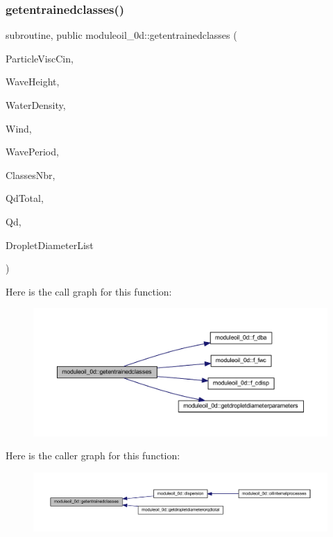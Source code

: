 \subsubsection{\texorpdfstring{getentrainedclasses()}{getentrainedclasses()}}
{\footnotesize\ttfamily subroutine, public moduleoil\+\_\+0d\+::getentrainedclasses (\begin{DoxyParamCaption}\item[{real, intent(in)}]{Particle\+Visc\+Cin,  }\item[{real, intent(in)}]{Wave\+Height,  }\item[{real, intent(in)}]{Water\+Density,  }\item[{real, intent(in)}]{Wind,  }\item[{real, intent(in)}]{Wave\+Period,  }\item[{integer, intent(in)}]{Classes\+Nbr,  }\item[{real, intent(out)}]{Qd\+Total,  }\item[{real, dimension(classesnbr), intent(out)}]{Qd,  }\item[{real, dimension(classesnbr), intent(out), optional}]{Droplet\+Diameter\+List }\end{DoxyParamCaption})}

Here is the call graph for this function\+:\nopagebreak
\begin{figure}[H]
\begin{center}
\leavevmode
\includegraphics[width=350pt]{namespacemoduleoil__0d_a3dc497493c2537b1f55d043f488bcb36_cgraph}
\end{center}
\end{figure}
Here is the caller graph for this function\+:\nopagebreak
\begin{figure}[H]
\begin{center}
\leavevmode
\includegraphics[width=350pt]{namespacemoduleoil__0d_a3dc497493c2537b1f55d043f488bcb36_icgraph}
\end{center}
\end{figure}
\mbox{\label{namespacemoduleoil__0d_a69465813f24b303b64f2b23399c114da}} 
